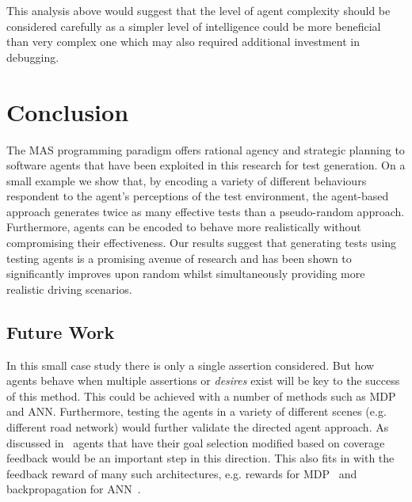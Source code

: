 \documentclass[letterpaper, 10 pt, journal, twoside]{IEEEtran}
\begin{document}
This analysis above would suggest that the level of agent complexity should be considered carefully as a simpler level of intelligence could be more beneficial than very complex one which may also required additional investment in debugging.





\section{Conclusion}
The MAS programming paradigm offers rational agency and strategic planning to software agents that have been exploited in this research for test generation. 
%
On a small example we show that, by encoding a variety of different behaviours respondent to the agent's perceptions of the test environment, the agent-based approach generates twice as many effective tests than a pseudo-random approach. Furthermore, agents can be encoded to behave more realistically without compromising their effectiveness. %
Our results suggest that generating tests using testing agents is a promising avenue of research and has been shown to significantly improves upon random whilst simultaneously providing more realistic driving scenarios.



\subsection{Future Work} \label{future}
%
In this small case study there is only a single assertion considered. But how agents behave when multiple assertions or \textit{desires} exist will be key to the success of this method. This could be achieved with a number of methods such as MDP and ANN. Furthermore, testing the agents in a variety of different scenes (e.g. different road network) would further validate the directed agent approach.
%
As discussed in~\cite{Eder2007} agents that have their goal selection modified based on coverage feedback would be an important step in this direction. This also fits in with the feedback reward of many such architectures, e.g. rewards for MDP~\cite{littman1994markov} and backpropagation for ANN~\cite{foerster2016learning}. 
\end{document}
